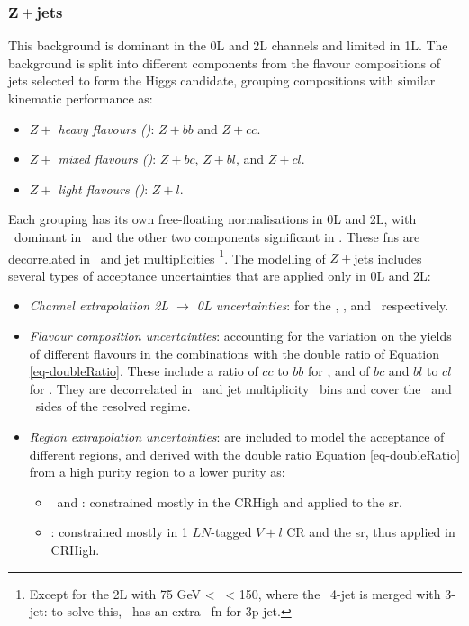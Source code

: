 \subsubsection{$\boldsymbol{Z+}$jets}
This background is dominant in the 0L and 2L channels and limited in 1L. The background is split into different components from the flavour compositions of jets selected to form the Higgs candidate, grouping compositions with similar kinematic performance as:   
\begin{itemize}
    \item \textit{$Z+$ heavy flavours (\zhf)}: $Z+bb$ and $Z+cc$.
    \item \textit{$Z+$ mixed flavours (\zmf)}: $Z+bc$, $Z+bl$, and $Z+cl$.
    \item \textit{$Z+$ light flavours (\zlf)}: $Z+l$.
\end{itemize}
Each grouping has its own free-floating normalisations in 0L and 2L, with \zhf\ dominant in \vhb\ and the other two components significant in \vhc. These \gls{fn}s are decorrelated in \ptv\ and jet multiplicities \nj\footnote{Except for the 2L with 75 GeV < \ptv\ < 150, where the \vhb\ 4-jet is merged with 3-jet: to solve this, \vhb\ has an extra \zhf\ \gls{fn} for 3p-jet.}. The modelling of $Z+$jets includes several types of acceptance uncertainties that are applied only in 0L and 2L:
\begin{itemize}[leftmargin=*]
    \item \textit{Channel extrapolation 2L $\rightarrow$ 0L uncertainties}: for the \zhf, \zmf, and \zlf\ respectively. 
    \item \textit{Flavour composition uncertainties}: accounting for the variation on the yields of different flavours in the combinations with the double ratio of Equation \ref{eq-doubleRatio}. These include a ratio of $cc$ to $bb$ for \zhf, and of $bc$ and $bl$ to $cl$ for \zmf. They are decorrelated in \ptv\ and jet multiplicity \nj\ bins and cover the \vhb\ and \vhc\ sides of the resolved regime. 
    \item \textit{Region extrapolation uncertainties}: are included to model the acceptance of different regions, and derived with the double ratio Equation \ref{eq-doubleRatio} from a high purity region to a lower purity as:
    \begin{itemize}
        \item \zhf\ and \zmf: constrained mostly in the CRHigh and applied to the \gls{sr}. 
        \item \zlf: constrained mostly in 1 $LN$-tagged $V+l$ CR and the \gls{sr}, thus applied in CRHigh. %
    \end{itemize}
\end{itemize}
